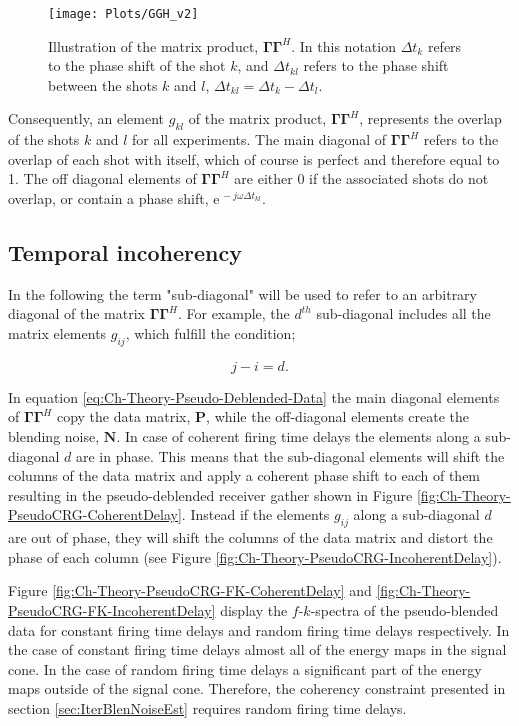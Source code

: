\begin{figure}
	\centering
	\texttt{[image: Plots/GGH\_v2]}
	\caption{Illustration of the matrix product, $\mathbf{\Gamma \Gamma}^H$. In this notation $\Delta t_k$ refers to the phase shift of the shot $k$, and $\Delta t_{kl}$ refers to the phase shift between the shots $k$ and $l$, $\Delta t_{kl} = \Delta t_k - \Delta t_l$.}
	\label{fig:Ch-Theory-GGH}
\end{figure}

Consequently, an element $g_{kl}$ of the matrix product, $\mathbf{\Gamma \Gamma}^H$, represents the overlap of the shots $k$ and $l$ for all experiments. The main diagonal of $\mathbf{\Gamma \Gamma}^H$ refers to the overlap of each shot with itself, which of course is perfect and therefore equal to 1. The off diagonal elements of $\mathbf{\Gamma \Gamma}^H$ are either 0 if the associated shots do not overlap, or contain a phase shift, $\mathrm{e}^{\, -j \omega \Delta t_{kl}}$.

\subsection*{Temporal incoherency}

In the following the term "sub-diagonal" will be used to refer to an arbitrary diagonal of the matrix $\mathbf{\Gamma \Gamma}^H$. For example, the $d^{th}$ sub-diagonal includes all the matrix elements $g_{ij}$, which fulfill the condition;

\begin{equation}
	j -i = d.
	\label{eq:Ch-Incoherency-Subdiagonal}
\end{equation}

In equation \ref{eq:Ch-Theory-Pseudo-Deblended-Data} the main diagonal elements of $\mathbf{\Gamma \Gamma}^H$ copy the data matrix, $\mathbf{P}$, while the off-diagonal elements create the blending noise, $\mathbf{N}$. In case of coherent firing time delays the elements along a sub-diagonal $d$ are in phase. This means that the sub-diagonal elements will shift the columns of the data matrix and apply a coherent phase shift to each of them resulting in the pseudo-deblended receiver gather shown in Figure \ref{fig:Ch-Theory-PseudoCRG-CoherentDelay}. Instead if the elements $g_{ij}$ along a sub-diagonal $d$ are out of phase, they will shift the columns of the data matrix and distort the phase of each column (see Figure \ref{fig:Ch-Theory-PseudoCRG-IncoherentDelay}). 

Figure \ref{fig:Ch-Theory-PseudoCRG-FK-CoherentDelay} and \ref{fig:Ch-Theory-PseudoCRG-FK-IncoherentDelay} display the $f$-$k$-spectra of the pseudo-blended data for constant firing time delays and random firing time delays respectively. In the case of constant firing time delays almost all of the energy maps in the signal cone. In the case of random firing time delays a significant part of the energy maps outside of the signal cone. Therefore, the coherency constraint presented in section \ref{sec:IterBlenNoiseEst} requires random firing time delays. 


